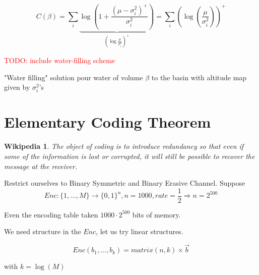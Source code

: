 \documentclass[twoside]{article}
\newtheorem*{wikipedia}{Wikipedia}
\theoremstyle{definition} %
\newcommand{\todo}[1]{\textcolor{red}{TODO: #1}}
\begin{document}
\[
  C(\beta) = \sum_i \underbrace{\log(1 + \frac{(\mu - \sigma_i^2)^+}{\sigma_i^2})}_{(\log \frac{\mu}{\sigma^2_i})^+} = \sum_i (\log(\frac{\mu}{\sigma^2_i}))^+
\]

\todo{include water-filling scheme}

"Water filling" solution pour water of volume $\beta$ to the basin with altitude map given by $\sigma^2_i$'s



\cleardoublepage
\section{Elementary Coding Theorem}

\begin{wikipedia}
  The object of coding is to introduce redundancy so that even if some of the information is lost or corrupted, it will still be possible to recover the message at the receiver.
\end{wikipedia}

Restrict ourselves to Binary Symmetric and Binary Erasive Channel. Suppose
\[
  Enc: \{1, ..., M\} \rightarrow \{ 0, 1\}^n, n = 1000, rate = \frac{1}{2}
  \Rightarrow n = 2^{500}
\]

Even the encoding table taken $1000 \cdot 2^{500}$ bits of memory.

We need structure in the $Enc$, let us try linear structures.

\[
  Enc(b_1, ..., b_k) = matrix(n, k) \times \vec{b}
\]

with $k = \log(M)$
\end{document}
